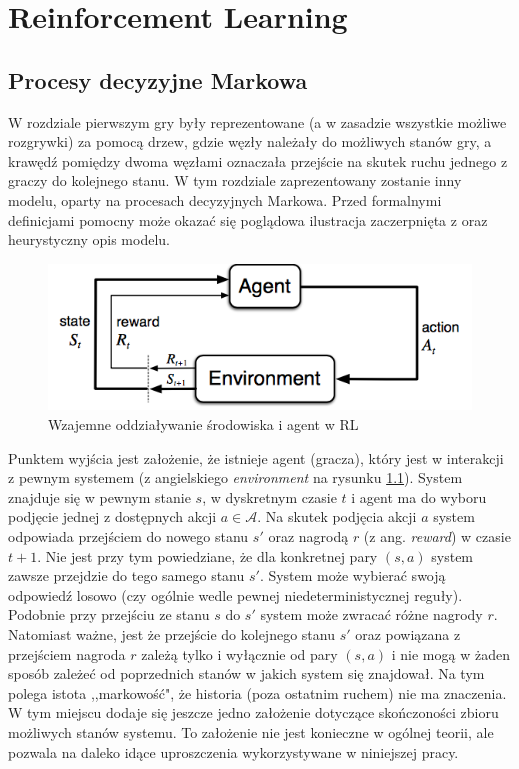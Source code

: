 \documentclass[licencjacka]{pracamgr}
\begin{document}
\chapter{Reinforcement Learning}\label{r:Tablica}

\section{Procesy decyzyjne Markowa}
W rozdziale pierwszym gry były reprezentowane (a w zasadzie wszystkie możliwe rozgrywki) za pomocą drzew, gdzie węzły należały do możliwych stanów gry, a krawędź pomiędzy dwoma węzłami oznaczała przejście na skutek ruchu jednego z graczy do kolejnego stanu. W tym rozdziale zaprezentowany zostanie inny modelu, oparty na procesach decyzyjnych Markowa.  Przed formalnymi definicjami pomocny może okazać się poglądowa ilustracja zaczerpnięta z \cite{RL} oraz  heurystyczny opis modelu.\\

\begin{figure}[h!]
	\includegraphics [scale=0.6] {agent_env.png}
	\caption{Wzajemne oddziaływanie środowiska i agent w RL}
	\label{Rys7}
\end{figure}

Punktem wyjścia jest założenie,  że istnieje agent (gracza), który jest w interakcji z pewnym systemem (z angielskiego \textit{environment} na rysunku \ref{Rys7}). System znajduje się w pewnym stanie $s$, w dyskretnym czasie $t$ i agent ma do wyboru podjęcie jednej z dostępnych akcji $a\in\mathcal{A}$. Na skutek podjęcia akcji $a$ system odpowiada przejściem do nowego stanu $s'$ oraz nagrodą $r$ (z ang. \textit{reward}) w czasie $t+1$.  Nie jest przy tym powiedziane, że dla konkretnej pary $(s,a)$ system zawsze przejdzie do tego samego stanu $s'$. System może wybierać swoją odpowiedź losowo (czy ogólnie wedle pewnej niedeterministycznej reguły). Podobnie przy przejściu ze stanu $s$ do $s'$ system może zwracać różne nagrody $r$.  Natomiast ważne, jest że przejście do kolejnego stanu $s'$ oraz powiązana z przejściem nagroda $r$ zależą tylko i wyłącznie od pary $(s,a)$ i nie mogą w  żaden sposób zależeć od poprzednich stanów w jakich system się znajdował. Na tym polega istota ,,markowość", że historia (poza ostatnim ruchem) nie ma znaczenia. W tym miejscu dodaje się jeszcze jedno założenie dotyczące skończoności  zbioru możliwych stanów systemu. To założenie nie jest konieczne w ogólnej teorii, ale pozwala na daleko idące uproszczenia wykorzystywane w niniejszej pracy.\\
\end{document}
